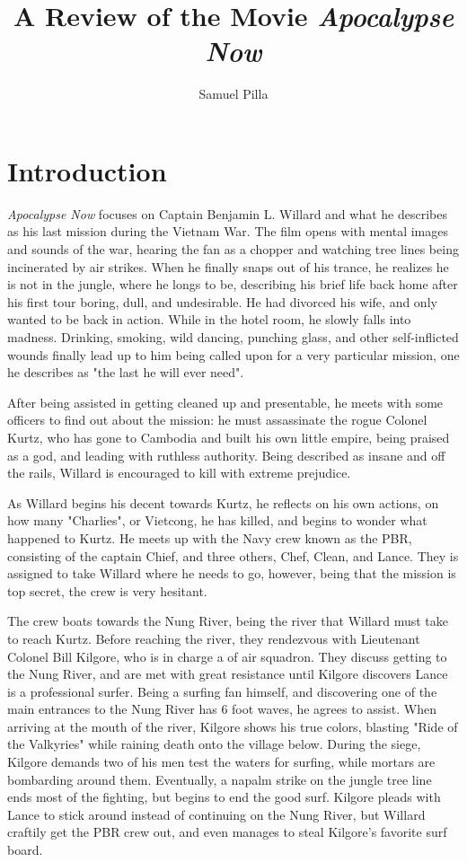 \documentclass[a4paper,man,natbib]{apa6}
\title{A Review of the Movie \textit{Apocalypse Now}}
\author{Samuel Pilla}
\affiliation{Missouri University of Science and Technology}
\begin{document}
\maketitle

\section{Introduction}

\textit{Apocalypse Now} focuses on Captain Benjamin L. Willard and what he describes as his last mission during the Vietnam War. The film opens with mental images and sounds of the war, hearing the fan as a chopper and watching tree lines being incinerated by air strikes. When he finally snaps out of his trance, he realizes he is not in the jungle, where he longs to be, describing his brief life back home after his first tour boring, dull, and undesirable. He had divorced his wife, and only wanted to be back in action. While in the hotel room, he slowly falls into madness. Drinking, smoking, wild dancing, punching glass, and other self-inflicted wounds finally lead up to him being called upon for a very particular mission, one he describes as "the last he will ever need".

After being assisted in getting cleaned up and presentable, he meets with some officers to find out about the mission: he must assassinate the rogue Colonel Kurtz, who has gone to Cambodia and built his own little empire, being praised as a god, and leading with ruthless authority. Being described as insane and off the rails, Willard is encouraged to kill with extreme prejudice.

As Willard begins his decent towards Kurtz, he reflects on his own actions, on how many "Charlies", or Vietcong, he has killed, and begins to wonder what happened to Kurtz. He meets up with the Navy crew known as the PBR, consisting of the captain Chief, and three others, Chef, Clean, and Lance. They is assigned to take Willard where he needs to go, however, being that the mission is top secret, the crew is very hesitant.

The crew boats towards the Nung River, being the river that Willard must take to reach Kurtz. Before reaching the river, they rendezvous with Lieutenant Colonel Bill Kilgore, who is in charge a of air squadron. They discuss getting to the Nung River, and are met with great resistance until Kilgore discovers Lance is a professional surfer. Being a surfing fan himself, and discovering one of the main entrances to the Nung River has 6 foot waves, he agrees to assist. When arriving at the mouth of the river, Kilgore shows his true colors, blasting "Ride of the Valkyries" while raining death onto the village below. During the siege, Kilgore demands two of his men test the waters for surfing, while mortars are bombarding around them. Eventually, a napalm strike on the jungle tree line ends most of the fighting, but begins to end the good surf. Kilgore pleads with Lance to stick around instead of continuing on the Nung River, but Willard craftily get the PBR crew out, and even manages to steal Kilgore's favorite surf board.
\end{document}
